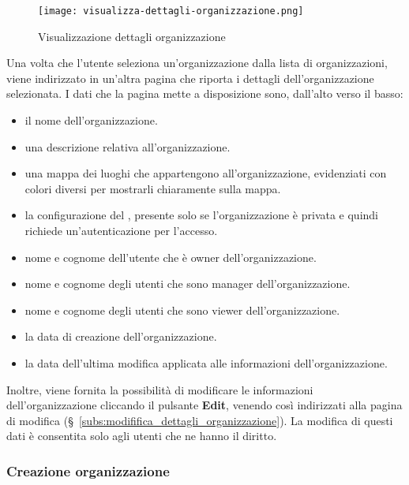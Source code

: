 \documentclass[../manuale-utente.tex]{subfiles}
\begin{document}
\begin{figure}[H]
    \centering
    \texttt{[image: visualizza-dettagli-organizzazione.png]}
    \caption{Visualizzazione dettagli organizzazione}%
    \label{fig:web_app_visualizzazione_dettagli_organizzazione}
\end{figure}
Una volta che l'utente seleziona un'organizzazione dalla lista di organizzazioni, viene indirizzato in un'altra pagina che riporta i dettagli dell'organizzazione selezionata.
I dati che la pagina mette a disposizione sono, dall'alto verso il basso:
\begin{itemize}
    \item il nome dell'organizzazione.
    \item una descrizione relativa all'organizzazione.
    \item una mappa dei luoghi che appartengono all'organizzazione, evidenziati con colori diversi per mostrarli chiaramente sulla mappa.
    \item la configurazione del , presente solo se l'organizzazione è privata e quindi richiede un'autenticazione per l'accesso.
    \item nome e cognome dell'utente che è owner dell'organizzazione.
    \item nome e cognome degli utenti che sono manager dell'organizzazione.
    \item nome e cognome degli utenti che sono viewer dell'organizzazione.
    \item la data di creazione dell'organizzazione.
    \item la data dell'ultima modifica applicata alle informazioni dell'organizzazione.
\end{itemize}
Inoltre, viene fornita la possibilità di modificare le informazioni dell'organizzazione cliccando il pulsante \textbf{Edit}, venendo così indirizzati alla pagina di modifica (§~\ref{subs:modififica_dettagli_organizzazione}).
La modifica di questi dati è consentita solo agli utenti che ne hanno il diritto.

\subsubsection{Creazione organizzazione}%
\label{subs:creazione_organizzazione}
\end{document}
